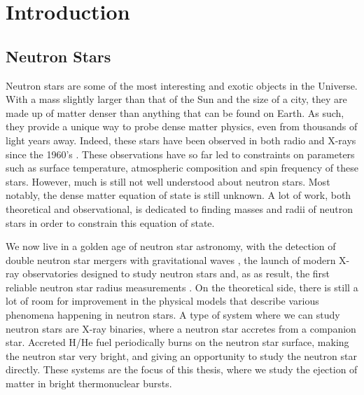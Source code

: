 \documentclass[../main.tex]{subfiles}
\begin{document}
\chapter{Introduction}\label{chapter1}
\section{Neutron Stars}\label{section:neutron_stars}
Neutron stars are some of the most interesting and exotic objects in the Universe.  With a mass slightly larger than that of the Sun and the size of a city, they are made up of matter denser than anything that can be found on Earth.  As such, they provide a unique way to probe dense matter physics, even from thousands of light years away.  Indeed, these stars have been observed in both radio and X-rays since the 1960's \citep{Hewish1968,Shklovsky1967}.  These observations have so far led to constraints on parameters such as surface temperature, atmospheric composition and spin frequency of these stars. However, much is still not well understood about neutron stars. Most notably, the dense matter equation of state is still unknown. A lot of work, both theoretical and observational, is dedicated to finding masses and radii of neutron stars in order to constrain this equation of state.
 
We now live in a golden age of neutron star astronomy, with the detection of double neutron star mergers with gravitational waves \citep{Abbott2017}, the launch of modern X-ray observatories designed to study neutron stars and, as as result, the first reliable neutron star radius measurements \citep{Gendreau2017,Miller2019}. On the theoretical side, there is still a lot of room for improvement in the physical models that describe various phenomena happening in neutron stars. A type of system where we can study neutron stars are X-ray binaries, where a neutron star accretes from a companion star. Accreted H/He fuel periodically burns on the neutron star surface, making the neutron star very bright, and giving an opportunity to study the neutron star directly. These systems are the focus of this thesis, where we study the ejection of matter in bright thermonuclear bursts. %

 
\end{document}
